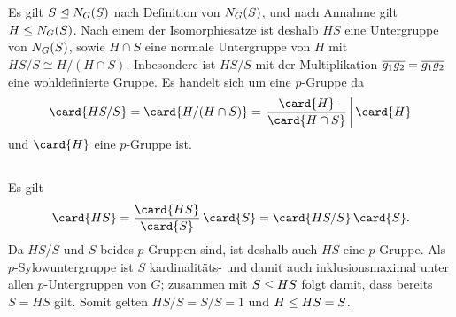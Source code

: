 \section{}





\addtocounter{subsection}{1}





\addtocounter{subsection}{1}





\subsection{}

Es gilt $S \nsubgroup \normalizer{S}{G}$ nach Definition von $\normalizer{S}{G}$, und nach Annahme gilt $H \subgroup \normalizer{S}{G}$.
Nach einem der Isomorphiesätze ist deshalb $HS$ eine Untergruppe von $\normalizer{S}{G}$, sowie $H \cap S$ eine normale Untergruppe von $H$ mit $HS/S \cong H/(H \cap S)$.
Inbesondere ist $HS/S$ mit der Multiplikation $\class{g_1} \class{g_2} = \class{g_1 g_2}$ eine wohldefinierte Gruppe.
Es handelt sich um eine $p$-Gruppe da
\[
                \card{ HS/S }
  =             \card{ H/(H \cap S) }
  = \left.      \frac{ \card{H} }{ \card{H \cap S} }
  \,\middle|\,  \card{H}
    \right.
\]
und $\card{H}$ eine $p$-Gruppe ist.





\subsection{}
\label{subsection: contained in Sylow subgroup}

Es gilt
\[
    \card{HS}
  = \frac{\card{HS}}{\card{S}} \, \card{S}
  = \card{HS/S} \, \card{S}.
\]
Da $HS/S$ und $S$ beides $p$-Gruppen sind, ist deshalb auch $HS$ eine $p$-Gruppe.
Als $p$-Sylowuntergruppe ist $S$ kardinalitäts- und damit auch inklusionsmaximal unter allen $p$-Untergruppen von $G$;
zusammen mit $S \subgroup HS$ folgt damit, dass bereits $S = HS$ gilt.
Somit gelten $HS/S = S/S = 1$ und $H \subgroup HS = S$.





\subsection{}
\label{subsection: unique fixed point}

